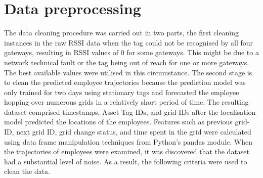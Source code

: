 \documentclass[acmtog]{acmart}
\begin{document}
\section{Data preprocessing}
The data cleaning procedure was carried out in two parts, the first cleaning instances in the raw RSSI data when the tag could not be recognised by all four gateways, resulting in RSSI values of 0 for some gateways. This might be due to a network technical fault or the tag being out of reach for one or more gateways. The best available values were utilised in this circumstance. The second stage is to clean the predicted employee trajectories because the prediction model was only trained for two days using stationary tags and forecasted the employee hopping over numerous grids in a relatively short period of time.  
The resulting dataset comprised timestamps, Asset Tag IDs, and grid-IDs after the localisation model predicted the locations of the employees. Features such as previous grid-ID, next grid ID, grid change status, and time spent in the grid were calculated using data frame manipulation techniques from Python's pandas module. When the trajectories of employees were examined, it was discovered that the dataset had a substantial level of noise. As a result, the following criteria were used to clean the data.
  
\end{document}
